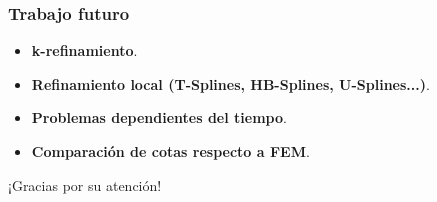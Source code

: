 \documentclass[compress]{beamer}
\begin{document}
\begin{frame}
	\frametitle{Trabajo futuro}
	\begin{itemize}
		\item \textbf{k-refinamiento}.
		\item \textbf{Refinamiento local (T-Splines, HB-Splines, U-Splines...)}.
		\item \textbf{Problemas dependientes del tiempo}.
		\item \textbf{Comparación de cotas respecto a FEM}.
	\end{itemize}
\end{frame}


\begin{frame}[plain] %
	\begin{center}
		{\Huge ¡Gracias por su atención!}
		
	\end{center}
\end{frame}

\end{document}
